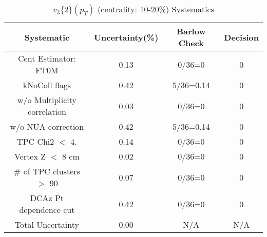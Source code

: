 \begin{table}[htbp]
\caption{$v_3\{2\}(p_{T})$ (centrality: 10-20\%) Systematics}
\label{tab:Sys_pTDiffv3}
\centering
\begin{tabular}{|c|c|c|c|}
\hline
Systematic & Uncertainty(\%) & Barlow Check & Decision \\
\hline
Cent Estimator: FT0M & 0.13 & 0/36=0 & 0 \\
kNoColl flags & 0.42 & 5/36=0.14 & 0 \\
w/o Multiplicity correlation & 0.03 & 0/36=0 & 0 \\
w/o NUA correction & 0.42 & 5/36=0.14 & 0 \\
TPC Chi2 $<$ 4. & 0.14 & 0/36=0 & 0 \\
Vertex Z $<$ 8 cm & 0.02 & 0/36=0 & 0 \\
\# of TPC clusters $>$ 90 & 0.07 & 0/36=0 & 0 \\
DCAz Pt dependence cut & 0.42 & 0/36=0 & 0 \\
\hline
Total Uncertainty & 0.00 & N/A & N/A \\
\hline
\end{tabular}
\end{table}
